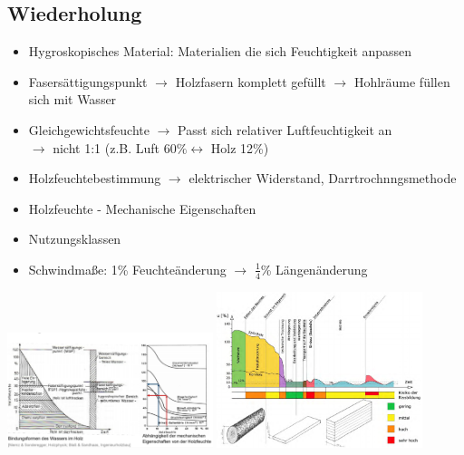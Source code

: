\documentclass[fleqn,twoside]{article}
\begin{document}
    \subsection{Wiederholung}
        \begin{itemize}
            \item Hygroskopisches Material: Materialien die sich Feuchtigkeit anpassen
            \item Fasersättigungspunkt $\rightarrow$ Holzfasern komplett gefüllt $\rightarrow$ Hohlräume füllen sich mit Wasser
            \item Gleichgewichtsfeuchte $\rightarrow$ Passt sich relativer Luftfeuchtigkeit an \\
                    $\rightarrow$ nicht 1:1 (z.B. Luft $60 \% \leftrightarrow$ Holz 12\%)
            \item Holzfeuchtebestimmung $\rightarrow$ elektrischer Widerstand, Darrtrochnngsmethode
            \item Holzfeuchte - Mechanische Eigenschaften
            \item Nutzungsklassen
            \item Schwindmaße: 1\% Feuchteänderung $\rightarrow$ $\frac{1}{4}$\% Längenänderung
        \end{itemize}
    \includegraphics[width=0.45\textwidth]{Grafiken/Holzfeuchte/Wiederholung 01.png}
    \includegraphics[width=0.45\textwidth]{Grafiken/Holzfeuchte/Wiederholung 02.png}\\
\end{document}
